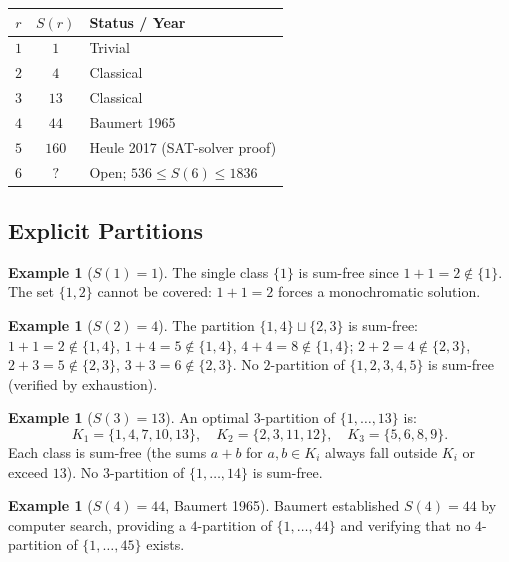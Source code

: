 \documentclass[12pt,a4paper]{amsart}
\theoremstyle{definition}
\newtheorem{example}[theorem]{Example}
\begin{document}
\begin{center}
\begin{tabular}{ccl}
\toprule
$r$ & $S(r)$ & Status / Year \\
\midrule
$1$ & $1$   & Trivial \\
$2$ & $4$   & Classical \\
$3$ & $13$  & Classical \\
$4$ & $44$  & Baumert 1965 \cite{Baumert1965} \\
$5$ & $160$ & Heule 2017 \cite{Heule2017} (SAT-solver proof) \\
$6$ & $?$   & Open; $536 \leq S(6) \leq 1836$ \\
\bottomrule
\end{tabular}
\end{center}

\subsection{Explicit Partitions}

\begin{example}[$S(1) = 1$]
The single class $\{1\}$ is sum-free since $1 + 1 = 2 \notin \{1\}$.
The set $\{1, 2\}$ cannot be covered: $1 + 1 = 2$ forces a monochromatic solution.
\end{example}

\begin{example}[$S(2) = 4$]
The partition $\{1,4\} \sqcup \{2,3\}$ is sum-free:
$1+1=2\notin\{1,4\}$, $1+4=5\notin\{1,4\}$, $4+4=8\notin\{1,4\}$;
$2+2=4\notin\{2,3\}$, $2+3=5\notin\{2,3\}$, $3+3=6\notin\{2,3\}$.
No $2$-partition of $\{1,2,3,4,5\}$ is sum-free (verified by exhaustion).
\end{example}

\begin{example}[$S(3) = 13$]
An optimal $3$-partition of $\{1,\ldots,13\}$ is:
\[
  K_1 = \{1,4,7,10,13\}, \quad K_2 = \{2,3,11,12\}, \quad K_3 = \{5,6,8,9\}.
\]
Each class is sum-free (the sums $a+b$ for $a,b \in K_i$ always fall outside $K_i$
or exceed $13$). No $3$-partition of $\{1,\ldots,14\}$ is sum-free.
\end{example}

\begin{example}[$S(4) = 44$, Baumert 1965]
Baumert \cite{Baumert1965} established $S(4) = 44$ by computer search, providing
a $4$-partition of $\{1,\ldots,44\}$ and verifying that no $4$-partition of
$\{1,\ldots,45\}$ exists.
\end{example}
\end{document}
